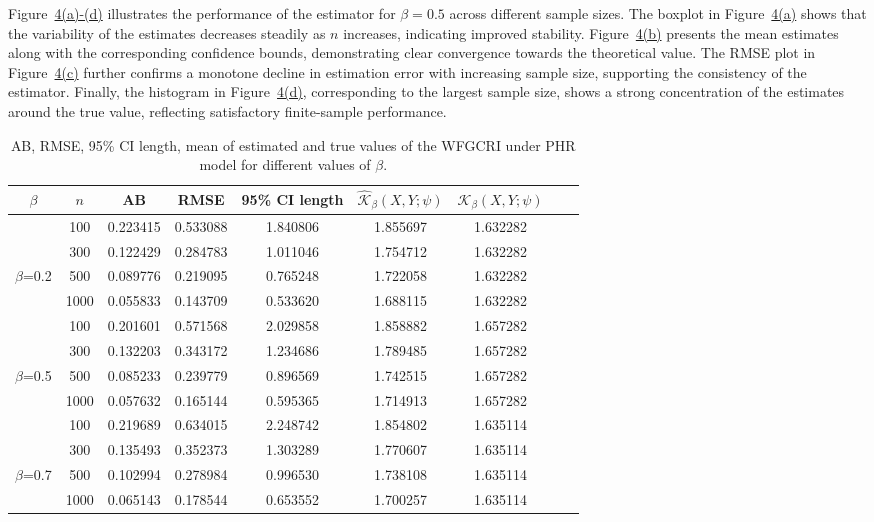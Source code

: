 \documentclass[12pt,a4paper]{article}
\numberwithin{equation}{section}
\begin{document}
Figure~\hyperref[fig3]{4(a)-(d)} illustrates the  performance of the estimator for $\beta= 0.5$ across different sample sizes. The boxplot in Figure~\hyperref[fig3]{4(a)} shows that the variability of the estimates decreases steadily as $n$ increases, indicating improved stability. Figure~\hyperref[fig3]{4(b)} presents the mean estimates along with the corresponding confidence bounds, demonstrating clear convergence towards the theoretical value. The RMSE plot in Figure~\hyperref[fig3]{4(c)} further confirms a monotone decline in estimation error with increasing sample size, supporting the consistency of the estimator. Finally, the histogram in Figure~\hyperref[fig3]{4(d)}, corresponding to the largest sample size, shows a strong concentration of the estimates around the true  value, reflecting satisfactory finite-sample performance.
\begin{table}[!htbp]
	\centering
	\caption{AB, RMSE, 95\% CI length, mean of estimated  and true values of the WFGCRI under  PHR model for different values of $\beta$.}
	\label{tab1}
	\begin{tabular}{ccccccccc}
		\toprule
		$\beta$ & $n$ & AB & RMSE & 95\% CI length & ${\widehat{\mathcal K}}_\beta(X,Y;\psi)$ & ${\mathcal K_\beta}(X,Y;\psi)$ \\
		\toprule
		&100 &0.223415&0.533088&1.840806&1.855697&1.632282\\
		&300 &0.122429&0.284783&1.011046&1.754712&1.632282\\
		$\beta$=0.2&500 &0.089776&0.219095&0.765248&1.722058&1.632282\\
		&1000&0.055833&0.143709&0.533620&1.688115&1.632282\\
		\hline
		
		&100 &0.201601&0.571568&2.029858&1.858882&1.657282\\
		&300 &0.132203&0.343172&1.234686&1.789485&1.657282\\
		$\beta$=0.5&500 &0.085233&0.239779&0.896569&1.742515&1.657282\\
		&1000&0.057632&0.165144&0.595365&1.714913&1.657282\\
		\hline
		
		&100 &0.219689&0.634015&2.248742&1.854802&1.635114\\
		&300 &0.135493&0.352373&1.303289&1.770607&1.635114\\
		$\beta$=0.7&500 &0.102994&0.278984&0.996530&1.738108&1.635114\\
		&1000&0.065143&0.178544&0.653552&1.700257&1.635114\\
		\hline
		

\end{tabular}
\end{table}
\end{document}
